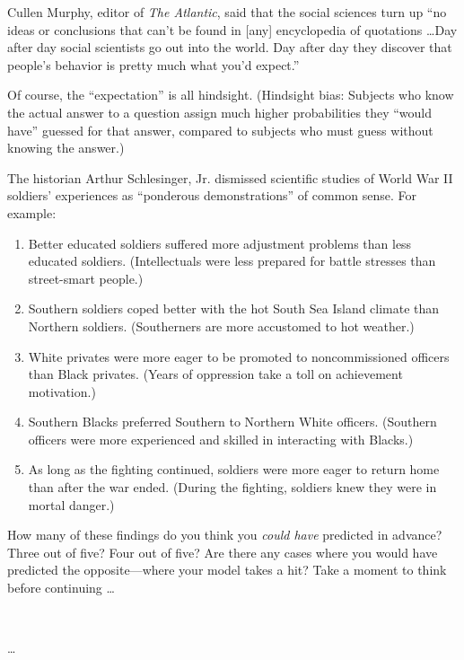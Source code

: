 {
 Cullen Murphy, editor of \textit{The Atlantic}, said that the
social sciences turn up ``no ideas or conclusions that
can't be found in [any] encyclopedia of quotations
\ldots Day after day social scientists go out into the world. Day after
day they discover that people's behavior is pretty much
what you'd expect.''}

{
 Of course, the ``expectation''
is all hindsight. (Hindsight bias: Subjects who know the actual answer
to a question assign much higher probabilities they
``would have'' guessed for that
answer, compared to subjects who must guess without knowing the
answer.)}

{
 The historian Arthur Schlesinger, Jr. dismissed scientific studies
of World War II soldiers' experiences as
``ponderous demonstrations'' of
common sense. For example:}

\begin{enumerate}
\item {
 Better educated soldiers suffered more adjustment problems than
less educated soldiers. (Intellectuals were less prepared for battle
stresses than street-smart people.)}

\item {
 Southern soldiers coped better with the hot South Sea Island
climate than Northern soldiers. (Southerners are more accustomed to hot
weather.)}

\item {
 White privates were more eager to be promoted to noncommissioned
officers than Black privates. (Years of oppression take a toll on
achievement motivation.)}

\item {
 Southern Blacks preferred Southern to Northern White officers.
(Southern officers were more experienced and skilled in interacting
with Blacks.)}

\item {
 As long as the fighting continued, soldiers were more eager to
return home than after the war ended. (During the fighting, soldiers
knew they were in mortal danger.)}
\end{enumerate}

{
 How many of these findings do you think you \textit{could have}
predicted in advance? Three out of five? Four out of five? Are there
any cases where you would have predicted the opposite---where your
model takes a hit? Take a moment to think before continuing \ldots}

{
 ~}

{
 \ldots}

